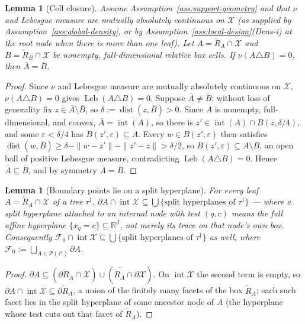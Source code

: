 \documentclass[11pt]{article}
\theoremstyle{plain}
\newtheorem{lemma}[theorem]{Lemma}
\theoremstyle{definition}
\theoremstyle{remark}
\newcommand{\R}{\mathbb{R}}
\newcommand{\cX}{\mathcal{X}}
\newcommand{\cP}{\mathcal{P}}
\newcommand{\cF}{\mathcal{F}}
\begin{document}
\begin{lemma}[Cell closure]\label{lem:cell-closure}
Assume Assumption~\ref{ass:support-geometry} and that \(\nu\) and Lebesgue
measure are mutually absolutely continuous on \(\cX\) (as supplied by
Assumption~\ref{ass:global-density}, or by
Assumption~\ref{ass:local-design}(Dens-i) at the root node when there is
more than one leaf). Let \(A=\widetilde R_A\cap\cX\) and \(B=\widetilde
R_B\cap\cX\) be nonempty, full-dimensional relative box cells. If
\(\nu(A\triangle B)=0\), then \(\overline A=\overline B\).
\end{lemma}
\begin{proof}
Since \(\nu\) and Lebesgue measure are mutually absolutely continuous on
\(\cX\), \(\nu(A\triangle B)=0\) gives \(\operatorname{Leb}(A\triangle B)=0\).
Suppose
\(\overline A\ne\overline B\); without loss of generality fix
\(z\in\overline A\setminus\overline B\), so
\(\delta:=\operatorname{dist}(z,\overline B)>0\). Since \(A\) is nonempty,
full-dimensional, and convex, \(\overline A=\overline{\operatorname{int}(A)}\),
so there is \(z'\in\operatorname{int}(A)\cap B(z,\delta/4)\), and some
\(\varepsilon<\delta/4\) has \(B(z',\varepsilon)\subseteq A\). Every
\(w\in B(z',\varepsilon)\) then satisfies
\(\operatorname{dist}(w,\overline B)\ge\delta-\|w-z'\|-\|z'-z\|>\delta/2\),
so \(B(z',\varepsilon)\subseteq A\setminus B\), an open ball of positive
Lebesgue measure, contradicting \(\operatorname{Leb}(A\triangle B)=0\).
Hence \(\overline A\subseteq\overline B\), and by symmetry
\(\overline A=\overline B\).
\end{proof}

\begin{lemma}[Boundary points lie on a split hyperplane]\label{lem:boundary-hyperplane}
For every leaf \(A=\widetilde R_A\cap\cX\) of a tree \(\tau^{\dagger}\),
\(\partial A\cap\operatorname{int}\cX\subseteq\bigcup\{\text{split
hyperplanes of }\tau^{\dagger}\}\) --- where a split hyperplane attached to
an internal node with test \((q,c)\) means the full affine hyperplane
\(\{x_q=c\}\subseteq\R^d\), not merely its trace on that node's own box.
Consequently \(\cF_0\cap\operatorname{int}\cX\subseteq\bigcup\{\text{split
hyperplanes of }\tau^{\dagger}\}\) as well, where
\(\cF_0:=\bigcup_{A\in\cP(\tau^{\dagger})}\partial A\).
\end{lemma}
\begin{proof}
\(\partial A\subseteq(\partial \widetilde R_A\cap\cX)\cup(\overline{\widetilde R_A}\cap\partial\cX)\).
On \(\operatorname{int}\cX\) the second term is empty, so
\(\partial A\cap\operatorname{int}\cX\subseteq\partial \widetilde R_A\), a union of the
finitely many facets of the box \(\widetilde R_A\); each such facet lies in the split
hyperplane of some ancestor node of \(A\) (the hyperplane whose test cuts
out that facet of \(\widetilde R_A\)).
\end{proof}
\end{document}
